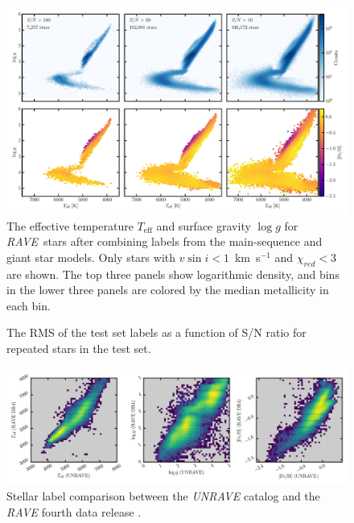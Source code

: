 \documentclass[preprint,trackchanges]{aastex}
\newcommand{\acronym}[1]{{\small{#1}}}
\newcommand{\project}[1]{\textsl{#1}}
\newcommand{\rave}{\project{\acronym{RAVE}}}
\newcommand{\teff}{T_{\mathrm{eff}}}
\newcommand{\logg}{\log g}
\begin{document}
\begin{figure}[p]
\includegraphics[width=\textwidth]{figures/hrd-test-set.pdf}
\caption{The effective temperature $\teff$ and surface gravity $\logg$ for \rave\ stars after combining labels from the main-sequence and giant star models.  Only stars with $v\sin{i} < 1$~km~s$^{-1}$ and $\chi_{red} < 3$ are shown.  The top three panels show logarithmic density, and bins in the lower three panels are colored by the median metallicity in each bin.\label{fig:test-set-hrd}}
\end{figure}



\begin{figure}[p]
\caption{The RMS of the test set labels as a function of S/N ratio for repeated stars in the test set.\label{fig:test-set-repeats}}
\end{figure}

\begin{figure}[p]
\includegraphics[width=\textwidth]{figures/dr4-comparison.png}
\caption{Stellar label comparison between the \project{UNRAVE} catalog and the \project{RAVE} fourth data release \citep{Kordopatis_2013}.\label{fig:rave-dr4-comparison}}
\end{figure}
\end{document}
